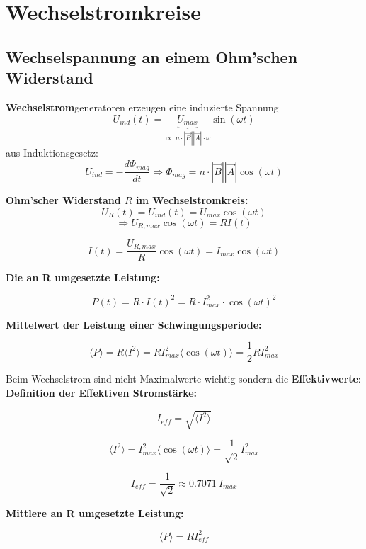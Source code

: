 \section{Wechselstromkreise}

\subsection{Wechselspannung an einem Ohm'schen Widerstand}
\textbf{Wechselstrom}generatoren erzeugen eine induzierte Spannung
\[
    U_{ind}(t) = \underbrace{U_{max}}_{\propto \ n\cdot |\Vec{B}||\Vec{A}|\cdot \omega} \sin{(\omega t)}
\]
\hspace{5mm}aus Induktionsgesetz:
\[
    U_{ind} = -\frac{d\Phi_{mag}}{dt} \Rightarrow \Phi_{mag} = n\cdot |\Vec{B}||\Vec{A}|\cos{(\omega t)}
\]

\textbf{Ohm'scher Widerstand $R$ im Wechselstromkreis:}
\[
    U_R(t) = U_{ind}(t) = U_{max}\cos{(\omega t)}
\]\[
    \Rightarrow U_{R,max}\cos{(\omega t)} = R I(t)
\]
\begin{formulabox}
    \[
        I(t) = \frac{U_{R,max}}{R}\cos{(\omega t)} = I_{max}\cos{(\omega t)}
    \]
\end{formulabox}

\textbf{Die an R umgesetzte Leistung:}
\begin{formulabox}
    \[
        P(t) = R\cdot I(t)^2 = R \cdot I_{max}^2 \cdot \cos{(\omega t)}^2
    \]
\end{formulabox}

\textbf{Mittelwert der Leistung einer Schwingungsperiode:}
\begin{formulabox}
    \[
        \langle P \rangle = R\langle I^2 \rangle = RI^2_{max} \langle \cos{(\omega t)} \rangle = \frac{1}{2} RI^2_{max}
    \]
\end{formulabox}

Beim Wechselstrom sind nicht Maximalwerte wichtig sondern die \textbf{Effektivwerte}:
\\[2ex]
\textbf{Definition der Effektiven Stromstärke:}
\begin{formulabox}
    \[
        I_{eff} = \sqrt{\langle I^2 \rangle}
    \]
\end{formulabox}
\[
    \langle I^2 \rangle = I^2_{max}\langle \cos{(\omega t)} \rangle = \frac{1}{\sqrt{2}}I^2_{max}
\]
\begin{formulabox}
    \[
        I_{eff} = \frac{1}{\sqrt{2}} \approx 0.7071  \ I_{max}
    \]
\end{formulabox}

\textbf{Mittlere an R umgesetzte Leistung:}
\begin{formulabox}
    \[
        \langle P \rangle = RI^2_{eff}
    \]
\end{formulabox}

